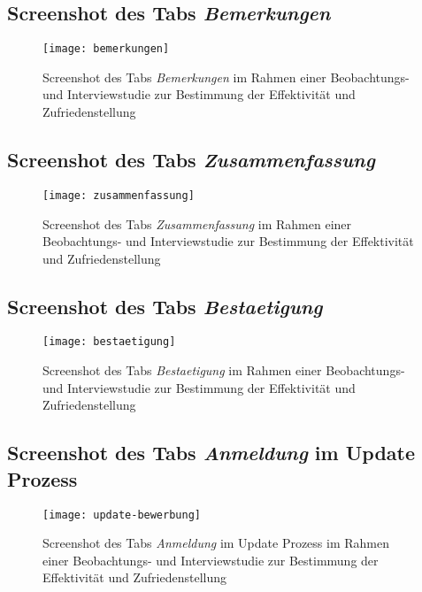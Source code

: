 \begin{landscape}
    \subsection{Screenshot des Tabs \textit{Bemerkungen}}
    \label{section-bemerkungen}
    \begin{figure}[H]
        \centering
        \caption{Screenshot des Tabs \textit{Bemerkungen} im Rahmen einer Beobachtungs- und Interviewstudie zur Bestimmung der Effektivität und Zufriedenstellung}
        \begin{adjustbox}{width=\linewidth, center}
            \texttt{[image: bemerkungen]}
        \end{adjustbox}
    \end{figure}

    \subsection{Screenshot des Tabs \textit{Zusammenfassung}}
    \label{section-zusammenfassung}
    \begin{figure}[H]
        \centering
        \caption{Screenshot des Tabs \textit{Zusammenfassung} im Rahmen einer Beobachtungs- und Interviewstudie zur Bestimmung der Effektivität und Zufriedenstellung}
        \begin{adjustbox}{width=\linewidth, center}
            \texttt{[image: zusammenfassung]}
        \end{adjustbox}
    \end{figure}

    \subsection{Screenshot des Tabs \textit{Bestaetigung}}
    \label{section-bestaetigung}
    \begin{figure}[H]
        \centering
        \caption{Screenshot des Tabs \textit{Bestaetigung} im Rahmen einer Beobachtungs- und Interviewstudie zur Bestimmung der Effektivität und Zufriedenstellung}
        \begin{adjustbox}{width=\linewidth, center}
            \texttt{[image: bestaetigung]}
        \end{adjustbox}
    \end{figure}

    \subsection{Screenshot des Tabs \textit{Anmeldung} im Update Prozess}
    \label{section-update-anmeldung}
    \begin{figure}[H]
        \centering
        \caption{Screenshot des Tabs \textit{Anmeldung} im Update Prozess im Rahmen einer Beobachtungs- und Interviewstudie zur Bestimmung der Effektivität und Zufriedenstellung}
        \begin{adjustbox}{width=\linewidth, center}
            \texttt{[image: update-bewerbung]}
        \end{adjustbox}
    \end{figure}

\end{landscape}
